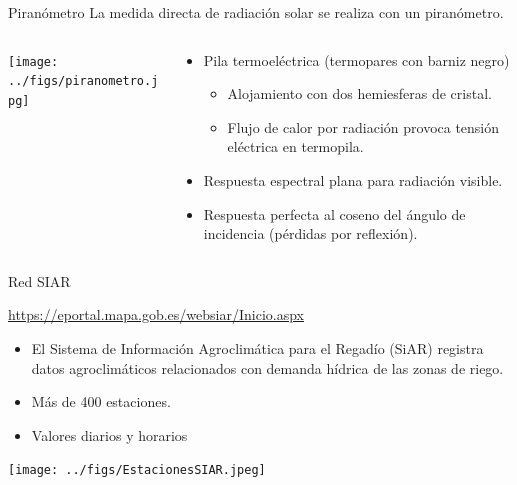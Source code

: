 \documentclass[aspectratio=169, usenames,svgnames,dvipsnames]{beamer}
\begin{document}
\begin{frame}[label={sec:orgecb296e}]{Piranómetro}
La medida directa de radiación solar se realiza con un piranómetro.
\begin{columns}
\begin{column}{0.4\columnwidth}
\begin{center}
\begin{center}
\texttt{[image: ../figs/piranometro.jpg]}
\end{center}
\end{center}
\end{column}
\begin{column}{0.6\columnwidth}
\begin{itemize}
\item Pila termoeléctrica (termopares con barniz negro)
\begin{itemize}
\item Alojamiento con dos hemiesferas de cristal.
\item Flujo de calor por radiación provoca tensión eléctrica en termopila.
\end{itemize}
\item Respuesta espectral plana para radiación visible.
\item Respuesta perfecta al coseno del ángulo de incidencia (pérdidas por reflexión).
\end{itemize}
\end{column}
\end{columns}
\end{frame}



\begin{frame}[label={sec:org435f59d}]{Red SIAR}
\begin{block}{\url{https://eportal.mapa.gob.es/websiar/Inicio.aspx}}
\begin{itemize}
\item El Sistema de Información Agroclimática para el Regadío (SiAR)
registra datos agroclimáticos relacionados con demanda hídrica de
las zonas de riego.

\item Más de 400 estaciones.

\item Valores diarios y horarios
\end{itemize}

\begin{center}
\begin{center}
\texttt{[image: ../figs/EstacionesSIAR.jpeg]}
\end{center}
\end{center}
\end{block}
\end{frame}
\end{document}
